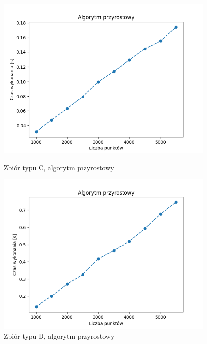 \documentclass[11pt]{article}
\theoremstyle{remark} \newtheorem{definition}{def.}
\theoremstyle{definition} \newtheorem{twierdzenie}{tw.}
\begin{document}
\begin{figure}[]
    \centering
    \begin{minipage}{0.48\textwidth}
        \centering
        \includegraphics[width=0.95\textwidth]{../tests/prost-przyrost.png} %
        \caption{Zbiór typu C, algorytm przyrostowy}
        \label{fig:prost-przyrost}
    \end{minipage}\hfill
    \begin{minipage}{0.48\textwidth}
        \centering
        \includegraphics[width=0.95\textwidth]{../tests/kw-przyrost.png} %
        \caption{Zbiór typu D, algorytm przyrostowy}
        \label{fig:kw-przyrost}
    \end{minipage}
\end{figure}
\end{document}
